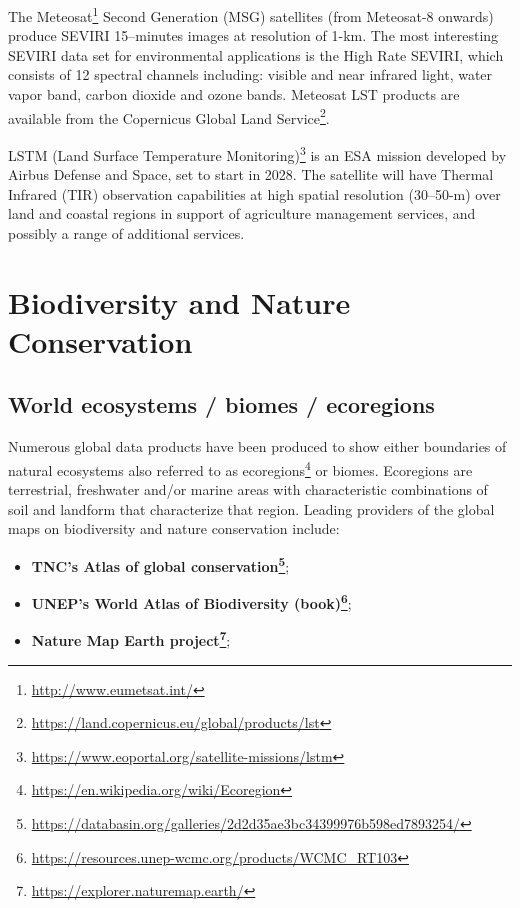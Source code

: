 \documentclass[
  graybox,natbib,nospthms]{svmono}
\providecommand{\tightlist}{%
  \setlength{\itemsep}{0pt}\setlength{\parskip}{0pt}}
\providecommand{\tightlist}{\setlength{\itemsep}{0pt}\setlength{\parskip}{0pt}}
\renewcommand{\href}[2]{#2 (\url{#1})}
\renewcommand{\href}[2]{#2\footnote{\url{#1}}}
\begin{document}
The \href{http://www.eumetsat.int/}{Meteosat} Second Generation (MSG) satellites
(from Meteosat-8 onwards) produce SEVIRI 15--minutes images at resolution of 1-km.
The most interesting SEVIRI data set for environmental applications is the High Rate SEVIRI,
which consists of 12 spectral channels including: visible and near infrared light,
water vapor band, carbon dioxide and ozone bands. Meteosat LST products are available
from the \href{https://land.copernicus.eu/global/products/lst}{Copernicus Global Land Service}.

\href{https://www.eoportal.org/satellite-missions/lstm}{LSTM (Land Surface Temperature Monitoring)} is an ESA mission developed by Airbus
Defense and Space, set to start in 2028. The satellite will have Thermal Infrared (TIR)
observation capabilities at high spatial resolution (30--50-m) over land and coastal
regions in support of agriculture management services, and possibly a range of additional services.

\hypertarget{biodiversity-and-nature-conservation}{%
\section{Biodiversity and Nature Conservation}\label{biodiversity-and-nature-conservation}}

\hypertarget{world-ecosystems-biomes-ecoregions}{%
\subsection{World ecosystems / biomes / ecoregions}\label{world-ecosystems-biomes-ecoregions}}

Numerous global data products have been produced to show either boundaries of natural
ecosystems also referred to as \href{https://en.wikipedia.org/wiki/Ecoregion}{ecoregions} or biomes.
Ecoregions are terrestrial, freshwater and/or marine areas with characteristic
combinations of soil and landform that characterize that region.
Leading providers of the global maps on biodiversity and nature conservation include:

\begin{itemize}
\tightlist
\item
  \textbf{\href{https://databasin.org/galleries/2d2d35ae3bc34399976b598ed7893254/}{TNC's Atlas of global conservation}};
\item
  \textbf{\href{https://resources.unep-wcmc.org/products/WCMC_RT103}{UNEP's World Atlas of Biodiversity (book)}};
\item
  \textbf{\href{https://explorer.naturemap.earth/}{Nature Map Earth project}};
\end{itemize}
\end{document}
